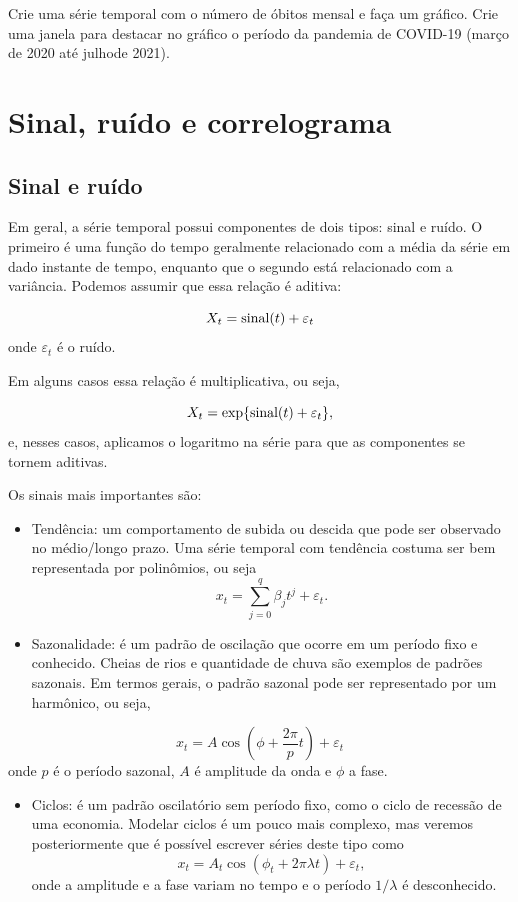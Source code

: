\documentclass[
  letterpaper,
  DIV=11,
  numbers=noendperiod]{scrreprt}
\providecommand{\tightlist}{%
  \setlength{\itemsep}{0pt}\setlength{\parskip}{0pt}}\usepackage{longtable,booktabs,array}
\begin{document}
Crie uma série temporal com o número de óbitos mensal e faça um gráfico.
Crie uma janela para destacar no gráfico o período da pandemia de
COVID-19 (março de 2020 até julhode 2021).


\chapter{Sinal, ruído e
correlograma}\label{sinal-ruuxeddo-e-correlograma}

\section{Sinal e ruído}\label{sinal-e-ruuxeddo}

Em geral, a série temporal possui componentes de dois tipos: sinal e
ruído. O primeiro é uma função do tempo geralmente relacionado com a
média da série em dado instante de tempo, enquanto que o segundo está
relacionado com a variância. Podemos assumir que essa relação é aditiva:

\[X_t=\hbox{sinal}(t)+\varepsilon_t\] onde \(\varepsilon_t\) é o ruído.

Em alguns casos essa relação é multiplicativa, ou seja,

\[X_t=\exp\{\hbox{sinal}(t)+\varepsilon_t\},\] e, nesses casos,
aplicamos o logaritmo na série para que as componentes se tornem
aditivas.

Os sinais mais importantes são:

\begin{itemize}
\item
  Tendência: um comportamento de subida ou descida que pode ser
  observado no médio/longo prazo. Uma série temporal com tendência
  costuma ser bem representada por polinômios, ou seja
  \[x_t= \sum_{j=0}^q\beta_j t^j +\varepsilon_t.\]
\item
  Sazonalidade: é um padrão de oscilação que ocorre em um período fixo e
  conhecido. Cheias de rios e quantidade de chuva são exemplos de
  padrões sazonais. Em termos gerais, o padrão sazonal pode ser
  representado por um harmônico, ou seja,
\end{itemize}

\[x_t=A\cos\left(\phi+\frac{2\pi}{p}t\right)+\varepsilon_t\] onde \(p\)
é o período sazonal, \(A\) é amplitude da onda e \(\phi\) a fase.

\begin{itemize}
\tightlist
\item
  Ciclos: é um padrão oscilatório sem período fixo, como o ciclo de
  recessão de uma economia. Modelar ciclos é um pouco mais complexo, mas
  veremos posteriormente que é possível escrever séries deste tipo como
  \[x_t=A_t\cos\left(\phi_t+2\pi\lambda t\right)+\varepsilon_t,\] onde a
  amplitude e a fase variam no tempo e o período \(1/\lambda\) é
  desconhecido.
\end{itemize}
\end{document}
